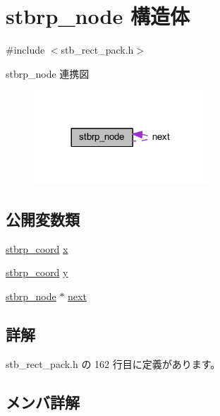 \hypertarget{structstbrp__node}{}\section{stbrp\+\_\+node 構造体}
\label{structstbrp__node}


{\ttfamily \#include $<$stb\+\_\+rect\+\_\+pack.\+h$>$}



stbrp\+\_\+node 連携図\nopagebreak
\begin{figure}[H]
\begin{center}
\leavevmode
\includegraphics[width=185pt]{structstbrp__node__coll__graph}
\end{center}
\end{figure}
\subsection*{公開変数類}
\begin{DoxyCompactItemize}
\item 
\mbox{\hyperlink{stb__rect__pack_8h_ac2c2491b95dea6a298b7423dc762dfd9}{stbrp\+\_\+coord}} \mbox{\hyperlink{structstbrp__node_a45ab31a88025db27d08040d715b129ea}{x}}
\item 
\mbox{\hyperlink{stb__rect__pack_8h_ac2c2491b95dea6a298b7423dc762dfd9}{stbrp\+\_\+coord}} \mbox{\hyperlink{structstbrp__node_ad0415cb102a4f37aa45073653307e67e}{y}}
\item 
\mbox{\hyperlink{structstbrp__node}{stbrp\+\_\+node}} $\ast$ \mbox{\hyperlink{structstbrp__node_a933cb2dd6cddc4fcaf10e3b40634bed4}{next}}
\end{DoxyCompactItemize}


\subsection{詳解}


 stb\+\_\+rect\+\_\+pack.\+h の 162 行目に定義があります。



\subsection{メンバ詳解}
\mbox{\label{structstbrp__node_a933cb2dd6cddc4fcaf10e3b40634bed4}} 
